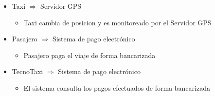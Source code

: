 \begin{itemize}
    \item Taxi $\Rightarrow$ Servidor GPS
    \begin{itemize}
        \item Taxi cambia de posicion y es monitoreado por el Servidor GPS
    \end{itemize} 

     \item Pasajero  $\Rightarrow$ Sistema de pago electr\'onico
    \begin{itemize}
        \item Pasajero paga el viaje de forma bancarizada
    \end{itemize} 


     \item TecnoTaxi  $\Rightarrow$ Sistema de pago electr\'onico
    \begin{itemize}
        \item El sistema consulta los pagos efectuados de forma bancarizada
    \end{itemize} 



\end{itemize}


